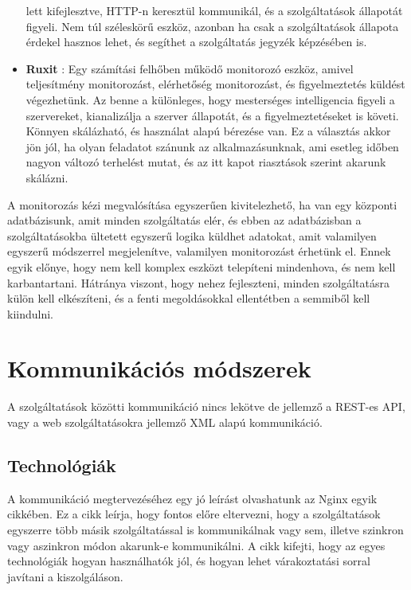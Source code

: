\documentclass[11pt,magyar,a4paper,twoside,]{report}
\begin{document}
\begin{itemize}
  lett kifejlesztve, HTTP-n keresztül kommunikál, és a szolgáltatások
  állapotát figyeli. Nem túl széleskörű eszköz, azonban ha csak a
  szolgáltatások állapota érdekel hasznos lehet, és segíthet a
  szolgáltatás jegyzék képzésében is.
\item
  \textbf{Ruxit}\citep{ruxit-overview} \citep{ruxit-monitoring}: Egy
  számítási felhőben működő monitorozó eszköz, amivel teljesítmény
  monitorozást, elérhetőség monitorozást, és figyelmeztetés küldést
  végezhetünk. Az benne a különleges, hogy mesterséges intelligencia
  figyeli a szervereket, kianalizálja a szerver állapotát, és a
  figyelmeztetéseket is követi. Könnyen skálázható, és használat alapú
  bérezése van. Ez a választás akkor jön jól, ha olyan feladatot szánunk
  az alkalmazásunknak, ami esetleg időben nagyon változó terhelést
  mutat, és az itt kapot riasztások szerint akarunk skálázni.
\end{itemize}

A monitorozás kézi megvalósítása egyszerűen kivitelezhető, ha van egy
központi adatbázisunk, amit minden szolgáltatás elér, és ebben az
adatbázisban a szolgáltatásokba ültetett egyszerű logika küldhet
adatokat, amit valamilyen egyszerű módszerrel megjelenítve, valamilyen
monitorozást érhetünk el. Ennek egyik előnye, hogy nem kell komplex
eszközt telepíteni mindenhova, és nem kell karbantartani. Hátránya
viszont, hogy nehez fejleszteni, minden szolgáltatásra külön kell
elkészíteni, és a fenti megoldásokkal ellentétben a semmiből kell
kiindulni.

\section{Kommunikációs
módszerek}\label{kommunikuxe1ciuxf3s-muxf3dszerek}

A szolgáltatások közötti kommunikáció nincs lekötve de jellemző a
REST-es API, vagy a web szolgáltatásokra jellemző XML alapú
kommunikáció\citep{rest-soap}.

\subsection{Technológiák}\label{technoluxf3giuxe1k}

A kommunikáció megtervezéséhez egy jó leírást olvashatunk az Nginx egyik
cikkében\citep{micro-communication}. Ez a cikk leírja, hogy fontos előre
eltervezni, hogy a szolgáltatások egyszerre több másik szolgáltatással
is kommunikálnak vagy sem, illetve szinkron vagy aszinkron módon
akarunk-e kommunikálni. A cikk kifejti, hogy az egyes technológiák
hogyan használhatók jól, és hogyan lehet várakoztatási sorral javítani a
kiszolgáláson.
\end{document}
